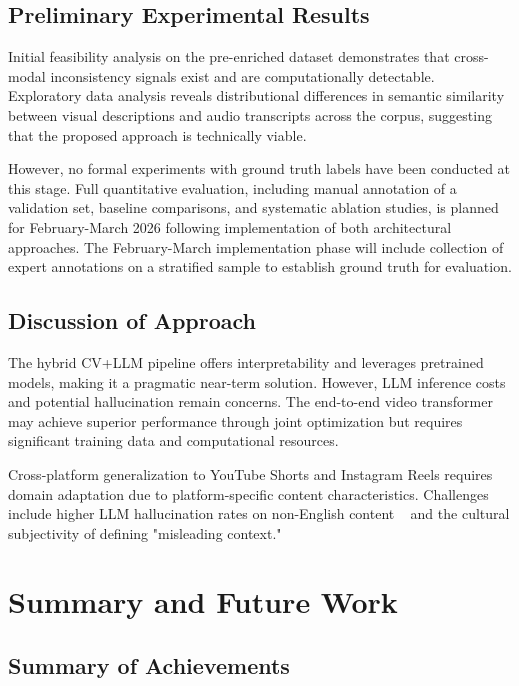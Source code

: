 \documentclass[runningheads]{llncs}
\begin{document}
\subsection{Preliminary Experimental Results}

Initial feasibility analysis on the pre-enriched dataset demonstrates that cross-modal inconsistency signals exist and are computationally detectable. Exploratory data analysis reveals distributional differences in semantic similarity between visual descriptions and audio transcripts across the corpus, suggesting that the proposed approach is technically viable.

However, no formal experiments with ground truth labels have been conducted at this stage. Full quantitative evaluation, including manual annotation of a validation set, baseline comparisons, and systematic ablation studies, is planned for February-March 2026 following implementation of both architectural approaches. The February-March implementation phase will include collection of expert annotations on a stratified sample to establish ground truth for evaluation.

\subsection{Discussion of Approach}

The hybrid CV+LLM pipeline offers interpretability and leverages pretrained models, making it a pragmatic near-term solution. However, LLM inference costs and potential hallucination remain concerns. The end-to-end video transformer may achieve superior performance through joint optimization but requires significant training data and computational resources.

Cross-platform generalization to YouTube Shorts and Instagram Reels requires domain adaptation due to platform-specific content characteristics. Challenges include higher LLM hallucination rates on non-English content ~\cite{llm_hallucination} and the cultural subjectivity of defining "misleading context."

\section{Summary and Future Work}

\subsection{Summary of Achievements}
\end{document}
